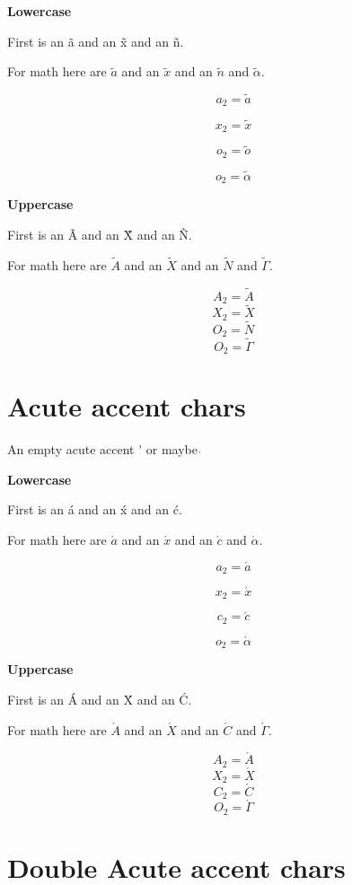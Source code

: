 \documentclass{article}
\begin{document}
\textbf{Lowercase}

First is an \~{a} and an \~{x} and an \~{n}.

For math here are $\tilde{a}$ and an $\tilde{x}$ and an $\tilde{n}$ and $\tilde{\alpha}$.

$$a_2=\tilde{a}$$

$$x_2=\tilde{x}$$

$$o_2=\tilde{o}$$

$$o_2=\tilde{\alpha}$$


\textbf{Uppercase}

First is an \~{A} and an \~{X} and an \~{N}.

For math here are $\tilde{A}$ and an $\tilde{X}$ and an $\tilde{N}$ and $\tilde{\Gamma}$.

$$A_2=\tilde{A}$$
$$X_2=\tilde{X}$$
$$O_2=\tilde{N}$$
$$O_2=\tilde{\Gamma}$$




\section{Acute accent chars}

An empty acute accent \'{} or maybe $\acute{}$

\textbf{Lowercase}

First is an \'{a} and an \'{x} and an \'{c}.

For math here are $\acute{a}$ and an $\acute{x}$ and an $\acute{c}$ and $\acute{\alpha}$.

$$a_2=\acute{a}$$

$$x_2=\acute{x}$$

$$c_2=\acute{c}$$

$$o_2=\acute{\alpha}$$

\textbf{Uppercase}

First is an \'{A} and an \'{X} and an \'{C}.

For math here are $\acute{A}$ and an $\acute{X}$ and an $\acute{C}$ and $\acute{\Gamma}$.

$$A_2=\acute{A}$$
$$X_2=\acute{X}$$
$$C_2=\acute{C}$$
$$O_2=\acute{\Gamma}$$




\section{Double Acute accent chars}
\end{document}
